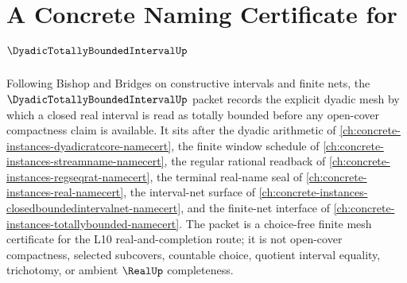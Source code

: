 \chapter{A Concrete Naming Certificate for $\DyadicTotallyBoundedIntervalUp$}
\label{ch:concrete-instances-dyadic-totally-bounded-interval-namecert}

Following Bishop and Bridges on constructive intervals and finite nets, the $\DyadicTotallyBoundedIntervalUp$ packet records the explicit dyadic mesh by which a closed real interval is read as totally bounded before any open-cover compactness claim is available. It sits after the dyadic arithmetic of \autoref{ch:concrete-instances-dyadicratcore-namecert}, the finite window schedule of \autoref{ch:concrete-instances-streamname-namecert}, the regular rational readback of \autoref{ch:concrete-instances-regseqrat-namecert}, the terminal real-name seal of \autoref{ch:concrete-instances-real-namecert}, the interval-net surface of \autoref{ch:concrete-instances-closedboundedintervalnet-namecert}, and the finite-net interface of \autoref{ch:concrete-instances-totallybounded-namecert}. The packet is a choice-free finite mesh certificate for the L10 real-and-completion route; it is not open-cover compactness, selected subcovers, countable choice, quotient interval equality, trichotomy, or ambient $\RealUp$ completeness.

